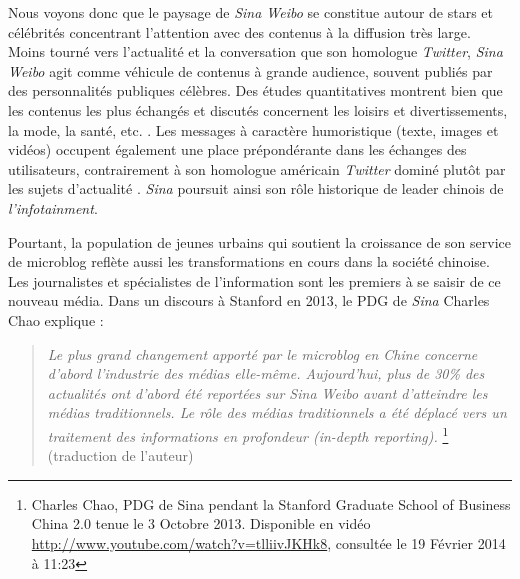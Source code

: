 Nous voyons donc que le paysage de \textit{Sina Weibo} se constitue autour de stars et célébrités concentrant l’attention avec des contenus à la diffusion très large. Moins tourné vers l’actualité et la conversation que son homologue \textit{Twitter}, \textit{Sina Weibo} agit comme véhicule de contenus à grande audience, souvent publiés par des personnalités publiques célèbres. Des études quantitatives montrent bien que les contenus les plus échangés et discutés concernent les loisirs et divertissements, la mode, la santé, etc. \citep{Li2013}. Les messages à caractère humoristique (texte, images et vidéos) occupent également une place prépondérante dans les échanges des utilisateurs, contrairement à son homologue américain \textit{Twitter} dominé plutôt par les sujets d’actualité \citep{Yu2011}. \textit{Sina} poursuit ainsi son rôle historique de leader chinois de \textit{l’infotainment}. 

Pourtant, la population de jeunes urbains qui soutient la croissance de son service de microblog reflète aussi les transformations en cours dans la société chinoise. Les journalistes et spécialistes de l’information sont les premiers à se saisir de ce nouveau média. Dans un discours à Stanford en 2013, le PDG de \textit{Sina} Charles Chao explique : 

\begin{quote}
\textit{Le plus grand changement apporté par le microblog en Chine concerne d’abord l’industrie des médias elle-même. Aujourd’hui, plus de 30\% des actualités ont d’abord été reportées sur \textit{Sina Weibo} avant d’atteindre les médias   traditionnels. Le rôle des médias traditionnels a été déplacé vers un traitement des informations en profondeur (in-depth reporting).} \footnote {Charles Chao, PDG de Sina pendant la Stanford Graduate School of Business China 2.0 tenue le 3 Octobre 2013. Disponible en vidéo \url{http://www.youtube.com/watch?v=tlliivJKHk8}, consultée le 19 Février 2014 à 11:23} (traduction de l’auteur)
\end{quote}

